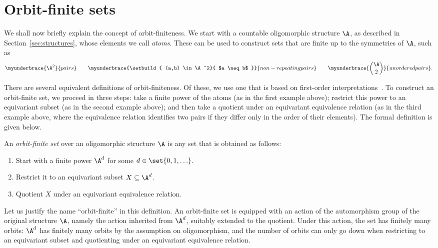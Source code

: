 \section{Orbit-finite sets}
\label{sec:orbit-finite-sets}
We shall now briefly explain the concept of orbit-finiteness.
We start with a countable oligomorphic structure $\A$, as described in Section~\ref{sec:structures}, whose elements we call \emph{atoms}. 
These can be used to construct sets that are finite up to the symmetries of $\A$, such as
\begin{align*}
   \myunderbrace{\A^2}{pairs}
   \qquad 
   \myunderbrace{\setbuild{ (a,b) \in \A^2}{ $a \neq b$ }}{non-repeating pairs}
   \qquad 
   \myunderbrace{\binom \A 2}{unordered pairs}.
\end{align*}

There are several equivalent definitions of orbit-finiteness. 
Of these, we use one that is based on first-order interpretations~\cite[Sec.~4.3]{hodges1993model}. 
To construct an orbit-finite set, we proceed in three steps: 
take a finite power of the atoms (as in the first example above); 
restrict this power to an equivariant subset (as in the second example above); 
and then take a quotient under an equivariant equivalence relation (as in the third example above, where the equivalence relation identifies two pairs if they differ only in the order of their elements). 
The formal definition is given below.

 \begin{definition}\label{def:orbit-finite-set}
    An \emph{orbit-finite set} over an oligomorphic structure $\A$ is any set that is obtained as follows: 
    \begin{enumerate}
        \item Start with a finite power $\A^d$ for some $d \in \set{0,1,\ldots}$.
        \item Restrict it to an equivariant subset $X \subseteq \A^d$.
        \item Quotient $X$ under an equivariant equivalence relation. 
    \end{enumerate}
 \end{definition}

Let us justify the name ``orbit-finite'' in this definition. 
An orbit-finite set is equipped with an action of the automorphism group of the original structure $\A$, namely the action inherited from $\A^d$, suitably extended to the quotient. 
Under this action, the set has finitely many orbits: 
$\A^d$ has finitely many orbits by the assumption on oligomorphism, 
and the number of orbits can only go down when restricting to an equivariant subset and quotienting under an equivariant equivalence relation. 
  
